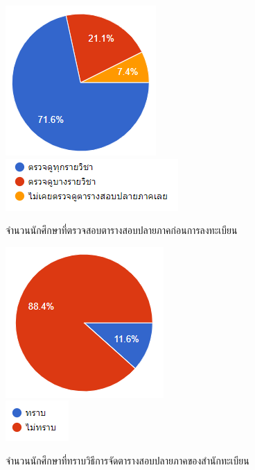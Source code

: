 \begin{figure}
\begin{center}
\includegraphics{images/check_enrollment.png}\\[2ex]
\includegraphics{images/type_check_enrollment.png}
\end{center}
\caption[Poem]{จำนวนนักศึกษาที่ตรวจสอบตารางสอบปลายภาคก่อนการลงทะเบียน}
\label{fig:enroll}     
\end{figure}

\begin{figure}
\begin{center}
\includegraphics{images/Create_exam.png}\\[2ex]
\includegraphics{images/type_Create_exam.png}
\end{center}
\caption[Poem]{จำนวนนักศึกษาที่ทราบวิธีการจัดตารางสอบปลายภาคของสำนักทะเบียน}
\label{fig:Create_exam}     
\end{figure}


